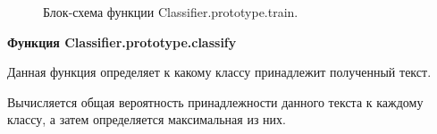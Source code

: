 \documentclass[14pt,a4paper]{extreport}
\begin{document}
    \begin{figure}[h]
    \caption{Блок-схема функции Classifier.prototype.train.}
    \label{ris:image}
    \end{figure}
    \newpage \par \textbf{Функция Classifier.prototype.classify}
    \\ \par Данная функция определяет к какому классу принадлежит полученный текст.
     \par Вычисляется общая вероятность принадлежности данного текста к каждому классу, а затем определяется максимальная из них.
\end{document}
